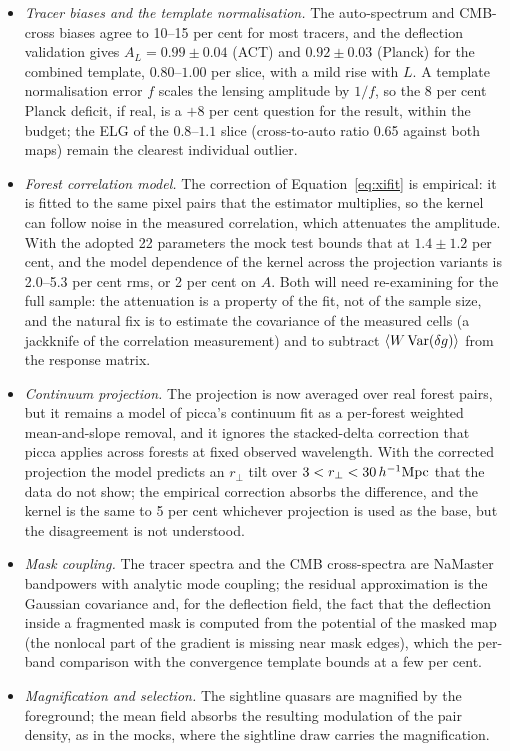 \documentclass[11pt,a4paper]{article}
\newcommand{\Mpch}{\,h^{-1}{\rm Mpc}}
\begin{document}
\begin{itemize}
\item \emph{Tracer biases and the template normalisation.} The auto-spectrum and CMB-cross biases agree to 10--15 per cent for most tracers, and the deflection validation gives $A_L=0.99\pm0.04$ (ACT) and $0.92\pm0.03$ (Planck) for the combined template, $0.80$--$1.00$ per slice, with a mild rise with $L$. A template normalisation error $f$ scales the lensing amplitude by $1/f$, so the 8 per cent Planck deficit, if real, is a $+8$ per cent question for the result, within the budget; the ELG of the $0.8$--$1.1$ slice (cross-to-auto ratio 0.65 against both maps) remain the clearest individual outlier.
\item \emph{Forest correlation model.} The correction of Equation~\eqref{eq:xifit} is empirical: it is fitted to the same pixel pairs that the estimator multiplies, so the kernel can follow noise in the measured correlation, which attenuates the amplitude. With the adopted 22 parameters the mock test bounds that at $1.4\pm1.2$ per cent, and the model dependence of the kernel across the projection variants is 2.0--5.3 per cent rms, or 2 per cent on $A$. Both will need re-examining for the full sample: the attenuation is a property of the fit, not of the sample size, and the natural fix is to estimate the covariance of the measured cells (a jackknife of the correlation measurement) and to subtract $\langle W\,{\rm Var}(\delta g)\rangle$ from the response matrix.
\item \emph{Continuum projection.} The projection is now averaged over real forest pairs, but it remains a model of picca's continuum fit as a per-forest weighted mean-and-slope removal, and it ignores the stacked-delta correction that picca applies across forests at fixed observed wavelength. With the corrected projection the model predicts an $r_\perp$ tilt over $3<r_\perp<30\Mpch$ that the data do not show; the empirical correction absorbs the difference, and the kernel is the same to 5 per cent whichever projection is used as the base, but the disagreement is not understood.
\item \emph{Mask coupling.} The tracer spectra and the CMB cross-spectra are NaMaster bandpowers with analytic mode coupling; the residual approximation is the Gaussian covariance and, for the deflection field, the fact that the deflection inside a fragmented mask is computed from the potential of the masked map (the nonlocal part of the gradient is missing near mask edges), which the per-band comparison with the convergence template bounds at a few per cent.
\item \emph{Magnification and selection.} The sightline quasars are magnified by the foreground; the mean field absorbs the resulting modulation of the pair density, as in the mocks, where the sightline draw carries the magnification.

\end{itemize}
\end{document}
